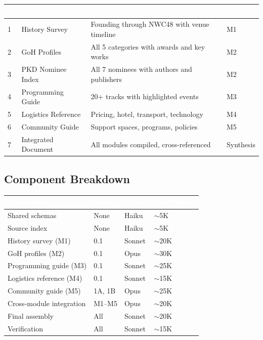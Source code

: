 \documentclass[11pt,letterpaper]{article}
\newcommand{\tableheader}[1]{\textbf{\sffamily\textcolor{white}{#1}}}
\begin{document}
\begin{center}
\begin{tabularx}{\textwidth}{C{0.5cm}L{3cm}XL{2cm}}
\toprule
{}
\tableheader{\#} & \tableheader{Deliverable} & \tableheader{Acceptance Criteria} & \tableheader{Spec} \\
 & History Survey & Founding through NWC48 with venue timeline & M1 \\
2 & GoH Profiles & All 5 categories with awards and key works & M2 \\
3 & PKD Nominee Index & All 7 nominees with authors and publishers & M2 \\
4 & Programming Guide & 20+ tracks with highlighted events & M3 \\
5 & Logistics Reference & Pricing, hotel, transport, technology & M4 \\
6 & Community Guide & Support spaces, programs, policies & M5 \\
7 & Integrated Document & All modules compiled, cross-referenced & Synthesis \\
\bottomrule
\end{tabularx}
\end{center}

\subsection{Component Breakdown}

\begin{center}
\begin{tabularx}{\textwidth}{L{3.5cm}L{1.5cm}L{2cm}C{2cm}}
\toprule
{}
\tableheader{Component} & \tableheader{Deps} & \tableheader{Model} & \tableheader{Est. Tokens} \\
\midrule
Shared schemas & None & Haiku & $\sim$5K \\
Source index & None & Haiku & $\sim$5K \\
History survey (M1) & 0.1 & Sonnet & $\sim$20K \\
GoH profiles (M2) & 0.1 & Opus & $\sim$30K \\
Programming guide (M3) & 0.1 & Sonnet & $\sim$25K \\
Logistics reference (M4) & 0.1 & Sonnet & $\sim$15K \\
Community guide (M5) & 1A, 1B & Opus & $\sim$25K \\
Cross-module integration & M1--M5 & Opus & $\sim$20K \\
Final assembly & All & Sonnet & $\sim$20K \\
Verification & All & Sonnet & $\sim$15K \\
\bottomrule
\end{tabularx}
\end{center}
\end{document}
